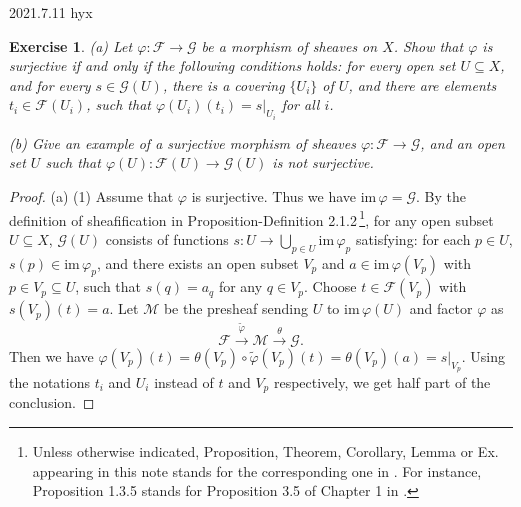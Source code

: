\documentclass[12pt]{amsart}
\newtheorem{exe}{Exercise}[subsection]
\begin{document}
2021.7.11 hyx
\begin{exe}
	\label{2.1.3}
    (a) Let $\varphi :\mathscr{F} \rightarrow\mathscr{G} $ be a morphism of sheaves on $X$. Show that
    $\varphi$ is surjective if and only if the following conditions holds: for every open set $U\subseteq X$, and for
    every $s\in\mathscr{G}(U)$, there is a covering $\{U_i\}$ of $U$, and there are elements $t_i\in\mathscr{F}(U_i)$,
    such that $\varphi(U_i)(t_i)=s|_{U_i}$ for all $i$.

    (b) Give an example of a surjective morphism of sheaves $\varphi :\mathscr{F} \rightarrow  \mathscr{G} $,
    and an open set $U$ such that $\varphi(U):\mathscr{F}(U) \rightarrow  \mathscr{G}(U) $ is not surjective.
\end{exe}

\begin{proof}
    (a) (1) Assume that $\varphi$ is surjective. Thus we have $\mathrm{im}\,\varphi=\mathscr{G}$. By the definition of sheafification in Proposition-Definition 2.1.2\,\footnote{Unless otherwise indicated, Proposition, Theorem, Corollary, Lemma or Ex. appearing in this note stands for the corresponding one in \cite{HAR}. For instance, Proposition 1.3.5 stands for Proposition 3.5 of Chapter 1 in \cite{HAR}.}, for any open subset $U\subseteq X$, $\mathscr{G}(U)$ consists of functions $s:U\to\bigcup_{p\in U}\mathrm{im}\,\varphi_p$ satisfying: for each $p\in U$, $s(p)\in\mathrm{im}\,\varphi_p$, and there exists an open subset $V_p$ and $a\in \mathrm{im}\,\varphi(V_p)$ with $p\in V_p \subseteq U$, such that
    $s(q)=a_q$ for any $q\in V_p$. Choose $t\in\mathscr{F}(V_p)$ with $s(V_p)(t)=a$. Let $\mathscr{M}$ be the presheaf sending $U$ to $\mathrm{im}\,\varphi(U)$ and factor $\varphi$ as$$\mathscr{F}\xrightarrow{\tilde{\varphi}}\mathscr{M}\xrightarrow{\theta}\mathscr{G}.$$ Then we have $\varphi(V_p)(t)=\theta(V_p)\circ\tilde{\varphi}(V_p)(t)=\theta(V_p)(a)=s|_{V_p}$. Using the notations $t_i$ and $U_i$ instead of $t$ and $V_p$ respectively, we get half part of the conclusion.
    

\end{proof}
\end{document}
